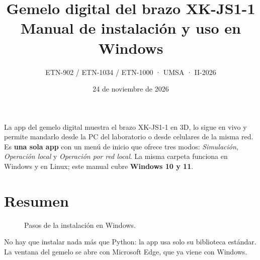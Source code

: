 \documentclass[a4paper,11pt]{article}
\title{\textbf{Gemelo digital del brazo XK-JS1-1}\\[4pt]\large Manual de instalación y uso en Windows}
\author{ETN-902 / ETN-1034 / ETN-1000 · UMSA · II-2026}
\date{24 de noviembre de 2026}
\begin{document}
\maketitle
\thispagestyle{fancy}

La app del gemelo digital muestra el brazo XK-JS1-1 en 3D, lo sigue en vivo y permite mandarlo desde la PC del laboratorio o desde celulares de la misma red. Es \textbf{una sola app} con un menú de inicio que ofrece tres modos: \emph{Simulación}, \emph{Operación local} y \emph{Operación por red local}. La misma carpeta funciona en Windows y en Linux; este manual cubre \textbf{Windows 10 y 11}.

\tableofcontents
\newpage

\section{Resumen}
\begin{figure}[H]
\centering
{}
\caption{Pasos de la instalación en Windows.}
\end{figure}
No hay que instalar nada más que Python: la app usa solo su biblioteca estándar. La ventana del gemelo se abre con Microsoft Edge, que ya viene con Windows.

\end{document}
